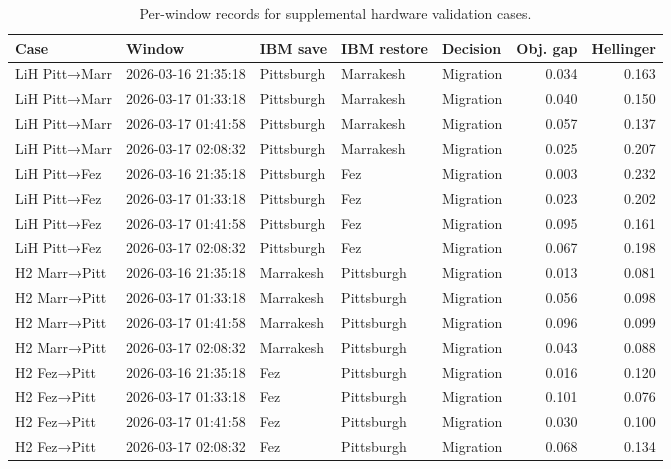 \begin{table}[t]
\centering
{}
\begin{tabular}{lllllrr}
\toprule
Case & Window & IBM save & IBM restore & Decision & Obj. gap & Hellinger \\
\midrule
LiH Pitt→Marr & 2026-03-16 21:35:18 & Pittsburgh & Marrakesh & Migration & 0.034 & 0.163 \\
LiH Pitt→Marr & 2026-03-17 01:33:18 & Pittsburgh & Marrakesh & Migration & 0.040 & 0.150 \\
LiH Pitt→Marr & 2026-03-17 01:41:58 & Pittsburgh & Marrakesh & Migration & 0.057 & 0.137 \\
LiH Pitt→Marr & 2026-03-17 02:08:32 & Pittsburgh & Marrakesh & Migration & 0.025 & 0.207 \\
LiH Pitt→Fez & 2026-03-16 21:35:18 & Pittsburgh & Fez & Migration & 0.003 & 0.232 \\
LiH Pitt→Fez & 2026-03-17 01:33:18 & Pittsburgh & Fez & Migration & 0.023 & 0.202 \\
LiH Pitt→Fez & 2026-03-17 01:41:58 & Pittsburgh & Fez & Migration & 0.095 & 0.161 \\
LiH Pitt→Fez & 2026-03-17 02:08:32 & Pittsburgh & Fez & Migration & 0.067 & 0.198 \\
H2 Marr→Pitt & 2026-03-16 21:35:18 & Marrakesh & Pittsburgh & Migration & 0.013 & 0.081 \\
H2 Marr→Pitt & 2026-03-17 01:33:18 & Marrakesh & Pittsburgh & Migration & 0.056 & 0.098 \\
H2 Marr→Pitt & 2026-03-17 01:41:58 & Marrakesh & Pittsburgh & Migration & 0.096 & 0.099 \\
H2 Marr→Pitt & 2026-03-17 02:08:32 & Marrakesh & Pittsburgh & Migration & 0.043 & 0.088 \\
H2 Fez→Pitt & 2026-03-16 21:35:18 & Fez & Pittsburgh & Migration & 0.016 & 0.120 \\
H2 Fez→Pitt & 2026-03-17 01:33:18 & Fez & Pittsburgh & Migration & 0.101 & 0.076 \\
H2 Fez→Pitt & 2026-03-17 01:41:58 & Fez & Pittsburgh & Migration & 0.030 & 0.100 \\
H2 Fez→Pitt & 2026-03-17 02:08:32 & Fez & Pittsburgh & Migration & 0.068 & 0.134 \\
\bottomrule
\end{tabular}
\caption{Per-window records for supplemental hardware validation cases.}
\label{tab:supplemental\_hw\_window\_records}
\end{table}
